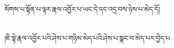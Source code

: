 སོགས་པ་སྟོན་པ་ལྟར་རྣལ་འབྱོར་པ་ཡང་དེ་དང་འདྲ་བས་ཉེས་པ་མེད་དོ།\chapter{ }།ཇི་སྟེ་རྣལ་འབྱོར་པའི་ཤེས་པ་གཉིས་མེད་པའི་ཤེས་པ་སྣང་བ་མེད་པར་བྱེད་པ